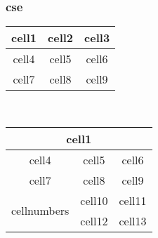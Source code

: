 \documentclass{article}
\begin{document}
\subsubsection{cse}
\begin{center}
\begin{tabular}{|c|c|c|}
\hline
cell1&cell2&cell3\\
\hline
cell4&cell5&cell6\\
\hline
cell7&cell8&cell9\\
\hline
\end{tabular}\\
\vspace{5mm}
\begin{tabular}{|c|c|c|}
\hline
\multicolumn{3}{|c|}{cell1}\\
\hline
cell4&cell5&cell6\\
\hline
cell7&cell8&cell9\\
\hline
\multirow{2}{10em}{cellnumbers} &cell10 &cell11\\
\cline{2-3}
&cell12 & cell13\\
\hline
\end{tabular}
\end{center}
\end{document}
